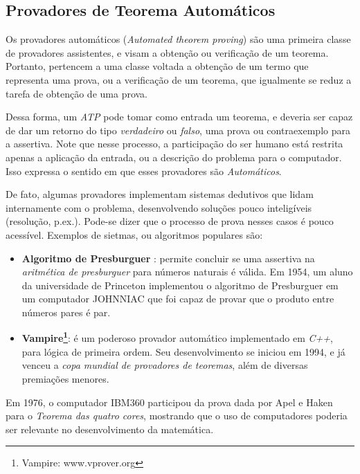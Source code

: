 \subsection{Provadores de Teorema Automáticos}
Os provadores automáticos (\textit{Automated theorem proving}) são uma primeira classe de provadores assistentes, e visam a obtenção ou verificação de um teorema.
Portanto, pertencem a uma classe voltada a obtenção de um termo que representa uma prova, ou a verificação de um teorema, que igualmente se reduz a tarefa de obtenção de uma prova.

Dessa forma, um \textit{ATP} pode tomar como entrada um teorema, e deveria ser capaz de dar um retorno do tipo \textit{verdadeiro} ou \textit{falso}, uma prova ou contraexemplo para a assertiva.
Note que nesse processo, a participação do ser humano está restrita apenas a aplicação da entrada, ou a descrição do problema para o computador.
Isso expressa o sentido em que esses provadores são \textit{Automáticos}.

De fato, algumas provadores implementam sistemas dedutivos que lidam internamente com o problema, desenvolvendo soluções pouco inteligíveis (resolução, p.ex.).
Pode-se dizer que o processo de prova nesses casos é pouco acessível. Exemplos de sietmas, ou algoritmos populares são:

\begin{itemize}
    \item \textbf{Algoritmo de Presburguer} : permite concluir se uma assertiva na \textit{aritmética de presburguer} para números naturais é válida. Em 1954, um aluno da universidade de Princeton implementou o algoritmo de Presburguer em um computador JOHNNIAC que foi capaz de provar que o produto entre números pares é par.
    \item \textbf{Vampire\footnote{Vampire: www.vprover.org}}: é um poderoso provador automático implementado em \textit{C++}, para lógica de primeira ordem. Seu desenvolvimento se iniciou em 1994, e já venceu a \textit{copa mundial de provadores de teoremas}, além de diversas premiações menores.
\end{itemize}

Em 1976, o computador IBM360 participou da prova dada por Apel e Haken para o \textit{Teorema das quatro cores}, mostrando que o uso de computadores poderia ser relevante no desenvolvimento da matemática.

